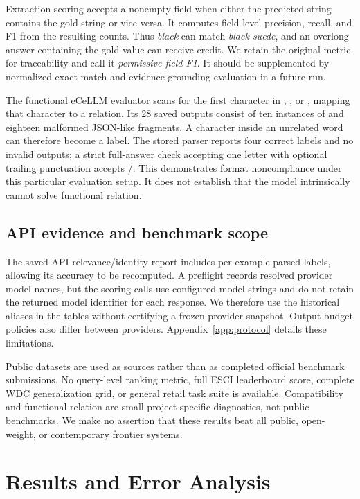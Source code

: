 Extraction scoring accepts a nonempty field when either the predicted string contains the gold string or vice versa. It computes field-level precision, recall, and F1 from the resulting counts. Thus \emph{black} can match \emph{black suede}, and an overlong answer containing the gold value can receive credit. We retain the original metric for traceability and call it \emph{permissive field F1}. It should be supplemented by normalized exact match and evidence-grounding evaluation in a future run.

The functional eCeLLM evaluator scans for the first character in , , or , mapping that character to a relation. Its 28 saved outputs consist of ten instances of  and eighteen malformed JSON-like fragments. A character inside an unrelated word can therefore become a label. The stored parser reports four correct labels and no invalid outputs; a strict full-answer check accepting one letter with optional trailing punctuation accepts \StrictEcellmValid{}/\EcellmRawN{}. This demonstrates format noncompliance under this particular evaluation setup. It does not establish that the model intrinsically cannot solve functional relation.

\subsection{API evidence and benchmark scope}
The saved API relevance/identity report includes per-example parsed labels, allowing its accuracy to be recomputed. A preflight records resolved provider model names, but the scoring calls use configured model strings and do not retain the returned model identifier for each response. We therefore use the historical aliases in the tables without certifying a frozen provider snapshot. Output-budget policies also differ between providers. Appendix~\ref{app:protocol} details these limitations.

Public datasets are used as sources rather than as completed official benchmark submissions. No query-level ranking metric, full ESCI leaderboard score, complete WDC generalization grid, or general retail task suite is available. Compatibility and functional relation are small project-specific diagnostics, not public benchmarks. We make no assertion that these results beat all public, open-weight, or contemporary frontier systems.

\section{Results and Error Analysis}
\label{sec:results}
